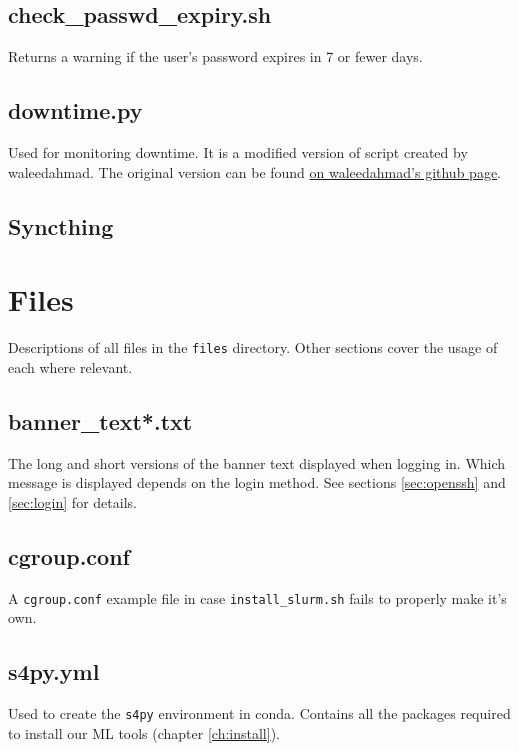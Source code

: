 \documentclass[10pt,letterpaper]{report}
\begin{document}
\section{check\_passwd\_expiry.sh}	\label{sec:passwdExp}
Returns a warning if the user's password expires in 7 or fewer days.

\section{downtime.py}				\label{sec:downtime}
Used for monitoring downtime. It is a modified version of script created by waleedahmad. The original version can be found \href{https://gist.github.com/waleedahmad/326ec53f76646dccec299910a7fb4f2b}{on waleedahmad's github page}.

\section{Syncthing}					\label{sec:syncthing}
	

\chapter{Files}						\label{ch:files}
Descriptions of all files in the \texttt{files} directory. Other sections cover the usage of each where relevant.

\section{banner\_text*.txt}	\label{sec:bannerText}
The long and short versions of the banner text displayed when logging in. Which message is displayed depends on the login method. See sections \ref{sec:openssh} and \ref{sec:login} for details.

\section{cgroup.conf}				\label{sec:cgroup}
A \texttt{cgroup.conf} example file in case \texttt{install\_slurm.sh} fails to properly make it's own.

\section{s4py.yml}					\label{sec:s4py}
Used to create the \texttt{s4py} environment in conda. Contains all the packages required to install our ML tools (chapter \ref{ch:install}).
\end{document}

